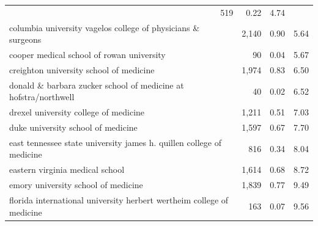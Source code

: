 \begin{table}[!h]
\begin{tabular}{llll}
  \multicolumn{1}{r}{519} &
  \multicolumn{1}{r}{0.22} &
  \multicolumn{1}{r}{4.74} \\
\multicolumn{1}{l}{\hspace{1em}columbia university vagelos college of physicians \& surgeons} &
  \multicolumn{1}{r}{2,140} &
  \multicolumn{1}{r}{0.90} &
  \multicolumn{1}{r}{5.64} \\
\multicolumn{1}{l}{\hspace{1em}cooper medical school of rowan university} &
  \multicolumn{1}{r}{90} &
  \multicolumn{1}{r}{0.04} &
  \multicolumn{1}{r}{5.67} \\
\multicolumn{1}{l}{\hspace{1em}creighton university school of medicine} &
  \multicolumn{1}{r}{1,974} &
  \multicolumn{1}{r}{0.83} &
  \multicolumn{1}{r}{6.50} \\
\multicolumn{1}{l}{\hspace{1em}donald \& barbara zucker school of medicine at hofstra/northwell} &
  \multicolumn{1}{r}{40} &
  \multicolumn{1}{r}{0.02} &
  \multicolumn{1}{r}{6.52} \\
\multicolumn{1}{l}{\hspace{1em}drexel university college of medicine} &
  \multicolumn{1}{r}{1,211} &
  \multicolumn{1}{r}{0.51} &
  \multicolumn{1}{r}{7.03} \\
\multicolumn{1}{l}{\hspace{1em}duke university school of medicine} &
  \multicolumn{1}{r}{1,597} &
  \multicolumn{1}{r}{0.67} &
  \multicolumn{1}{r}{7.70} \\
\multicolumn{1}{l}{\hspace{1em}east tennessee state university james h. quillen college of medicine} &
  \multicolumn{1}{r}{816} &
  \multicolumn{1}{r}{0.34} &
  \multicolumn{1}{r}{8.04} \\
\multicolumn{1}{l}{\hspace{1em}eastern virginia medical school} &
  \multicolumn{1}{r}{1,614} &
  \multicolumn{1}{r}{0.68} &
  \multicolumn{1}{r}{8.72} \\
\multicolumn{1}{l}{\hspace{1em}emory university school of medicine} &
  \multicolumn{1}{r}{1,839} &
  \multicolumn{1}{r}{0.77} &
  \multicolumn{1}{r}{9.49} \\
\multicolumn{1}{l}{\hspace{1em}florida international university herbert wertheim college of medicine} &
  \multicolumn{1}{r}{163} &
  \multicolumn{1}{r}{0.07} &
  \multicolumn{1}{r}{9.56} \\

\end{tabular}
\end{table}
